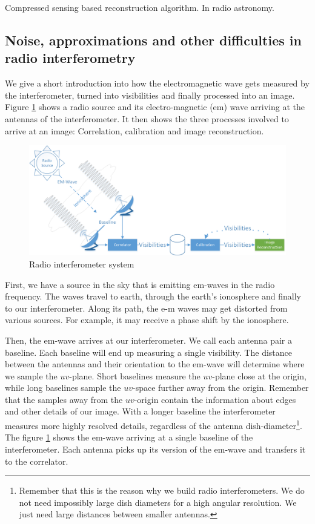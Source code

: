 Compressed sensing based reconstruction algorithm. In radio astronomy.



\subsection{Noise, approximations and other difficulties in radio interferometry}
We give a short introduction into how the electromagnetic wave gets measured by the interferometer, turned into visibilities and finally processed into an image. Figure \ref{intro:system} shows a radio source and its electro-magnetic (em) wave arriving at the antennas of the interferometer. It then shows the three processes involved to arrive at an image: Correlation, calibration and image reconstruction.
	
\begin{figure}[h]
	\centering
	\includegraphics[width=0.80\linewidth]{./chapters/01.intro/system.png}
	\caption{Radio interferometer system}
	\label{intro:system}
\end{figure}

First, we have a source in the sky that is emitting em-waves in the radio frequency. The waves travel to earth, through the earth's ionosphere and finally to our interferometer. Along its path, the e-m waves may get distorted from various sources. For example, it may receive a phase shift by the ionosphere.

Then, the em-wave arrives at our interferometer. We call each antenna pair a baseline. Each baseline will end up measuring a single visibility. The distance between the antennas and their orientation to the em-wave will determine where we sample the $uv$-plane. Short baselines measure the $uv$-plane close at the origin, while long baselines sample the $uv$-space further away from the origin. Remember that the samples away from the $uv$-origin contain the information about edges and other details of our image. With a longer baseline the interferometer measures more highly resolved details, regardless of the antenna dish-diameter\footnote{Remember that this is the reason why we build radio interferometers. We do not need impossibly large dish diameters for a high angular resolution. We just need large distances between smaller antennas.}. The figure \ref{intro:system} shows the em-wave arriving at a single baseline of the interferometer. Each antenna picks up its version of the em-wave and transfers it to the correlator.

